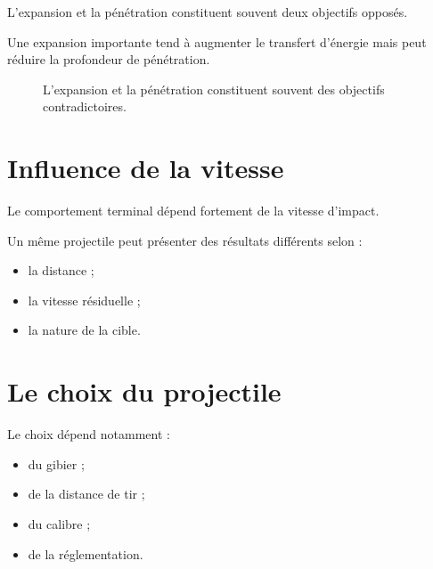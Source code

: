 L'expansion et la pénétration constituent souvent deux objectifs opposés.

Une expansion importante tend à augmenter le transfert d'énergie mais peut
réduire la profondeur de pénétration.

\begin{figure}[htbp]
\centering


\caption{L'expansion et la pénétration constituent souvent des objectifs contradictoires.}
\label{fig:compromis_expansion_penetration}

\end{figure}

\section{Influence de la vitesse}

Le comportement terminal dépend fortement de la vitesse d'impact.

Un même projectile peut présenter des résultats différents selon :

\begin{itemize}
    \item la distance ;
    \item la vitesse résiduelle ;
    \item la nature de la cible.
\end{itemize}

\section{Le choix du projectile}

Le choix dépend notamment :

\begin{itemize}
    \item du gibier ;
    \item de la distance de tir ;
    \item du calibre ;
    \item de la réglementation.
\end{itemize}

